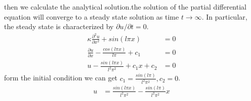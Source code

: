 \documentclass[a4paper]{article}
\begin{document}
        then we calculate the analytical solution.the solution of the partial differential equation will converge to a steady state solution as time $t \rightarrow \infty$. In particular, the steady state is characterized by $\partial u / \partial t = 0$. 
        \begin{align*}
            \kappa  \frac{\partial^2 u}{\partial x^2} + sin(l\pi x) &= 0 \\
            \frac{\partial u}{\partial x} - \frac{cos(l \pi x)}{l \pi} + c_1 &= 0 \\
            u - \frac{sin(l \pi x)}{l^2\pi^2} + c_1x + c_2 &= 0
        \end{align*}
        form the initial condition we can get $c_1 = \frac{sin(l \pi)}{l^2 \pi^2}, c_2 = 0 $.
        \begin{align*}
            u &= \frac{sin(l \pi x)}{l^2\pi^2} - \frac{sin(l \pi)}{l^2 \pi^2}x
        \end{align*}
        
\end{document}
